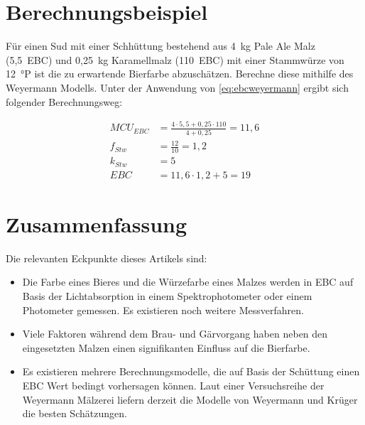 \documentclass[a4paper,parskip=half]{scrartcl}
\newcommand{\MCUEBC}{\mathit{MCU}_{EBC}}
\newcommand{\EBC}{\mathit{EBC}}
\newcommand{\fstw}{f_{Stw}}
\newcommand{\kstw}{k_{Stw}}
\begin{document}
\section*{Berechnungsbeispiel}

Für einen Sud mit einer Schhüttung bestehend aus 4~kg Pale Ale Malz (5,5~EBC) und 0,25~kg Kara­mell­mal­z (110~EBC) mit einer Stammwürze von 12~°P ist die zu erwartende Bierfarbe abzuschätzen. Berechne diese mithilfe des Weyermann Modells. Unter der Anwendung von \autoref{eq:ebcweyermann} ergibt sich folgender Berechnungsweg:

\begin{align*}
\MCUEBC &= \frac{4 \cdot 5,5 + 0,25 \cdot 110}{4 + 0,25} = 11,6 \\
\fstw &= \frac{12}{10} = 1,2 \\
\kstw &= 5 \\
\EBC &= 11,6 \cdot 1,2 + 5 = 19
\end{align*}

\section*{Zusammenfassung}

Die relevanten Eckpunkte dieses Artikels sind:

\begin{itemize}
\item Die Farbe eines Bieres und die Würzefarbe eines Malzes werden in EBC auf Basis der Lichtabsorption in einem Spektrophotometer oder einem Photometer gemessen. Es existieren noch weitere Messverfahren.
\item Viele Faktoren während dem Brau- und Gärvorgang haben neben den eingesetzten Malzen einen signifikanten Einfluss auf die Bierfarbe.
\item Es existieren mehrere Berechnungsmodelle, die auf Basis der Schüttung einen EBC Wert bedingt vorhersagen können. Laut einer Versuchsreihe der Weyermann Mälzerei liefern derzeit die Modelle von Weyermann und Krüger die besten Schätzungen.
\end{itemize}

\printbibliography[title=Quellen]
\end{document}

